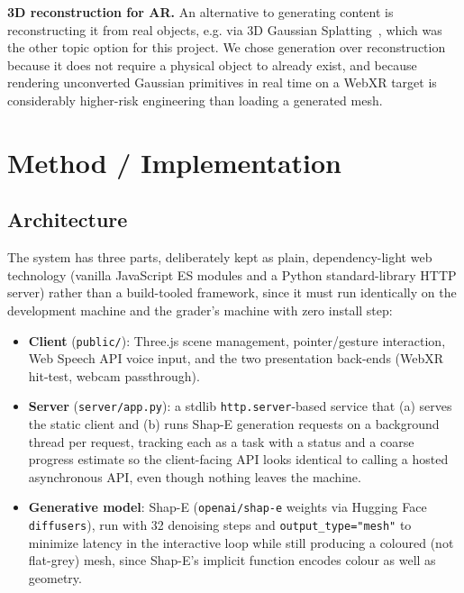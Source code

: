 \documentclass[sigconf,nonacm]{acmart}
\begin{document}
\textbf{3D reconstruction for AR.} An alternative to generating content is
reconstructing it from real objects, e.g. via 3D Gaussian
Splatting~\cite{kerbl20233d}, which was the other topic option for this
project. We chose generation over reconstruction because it does not
require a physical object to already exist, and because rendering
unconverted Gaussian primitives in real time on a WebXR target is
considerably higher-risk engineering than loading a generated mesh.

\section{Method / Implementation}
\label{sec:method}

\subsection{Architecture}
The system has three parts, deliberately kept as plain, dependency-light
web technology (vanilla JavaScript ES modules and a Python standard-library
HTTP server) rather than a build-tooled framework, since it must run
identically on the development machine and the grader's machine with zero
install step:

\begin{itemize}
  \item \textbf{Client} (\texttt{public/}): Three.js scene management,
  pointer/gesture interaction, Web Speech API voice input, and the two
  presentation back-ends (WebXR hit-test, webcam passthrough).
  \item \textbf{Server} (\texttt{server/app.py}): a stdlib
  \texttt{http.server}-based service that (a) serves the static client and
  (b) runs Shap-E generation requests on a background thread per request,
  tracking each as a task with a status and a coarse progress estimate so
  the client-facing API looks identical to calling a hosted asynchronous
  API, even though nothing leaves the machine.
  \item \textbf{Generative model}: Shap-E (\texttt{openai/shap-e} weights
  via Hugging Face \texttt{diffusers}), run with 32 denoising steps and
  \texttt{output\_type="mesh"} to minimize latency in the interactive loop
  while still producing a coloured (not flat-grey) mesh, since Shap-E's
  implicit function encodes colour as well as geometry.
\end{itemize}
\end{document}
